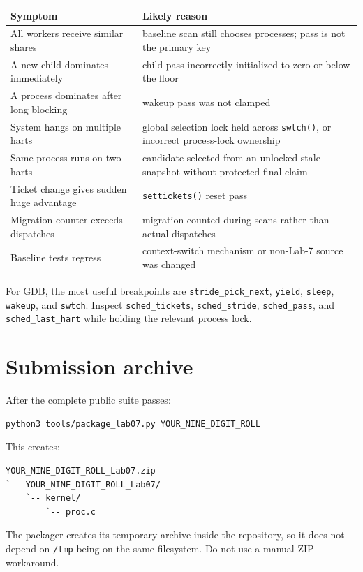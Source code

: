 \documentclass[11pt,a4paper]{article}
\newcommand{\file}[1]{\texttt{#1}}
\begin{document}
\begin{tabularx}{\textwidth}{@{}p{46mm}X@{}}
\toprule
\textbf{Symptom} & \textbf{Likely reason} \\
\midrule
All workers receive similar shares & baseline scan still chooses processes; pass is not the primary key \\
A new child dominates immediately & child pass incorrectly initialized to zero or below the floor \\
A process dominates after long blocking & wakeup pass was not clamped \\
System hangs on multiple harts & global selection lock held across \file{swtch()}, or incorrect process-lock ownership \\
Same process runs on two harts & candidate selected from an unlocked stale snapshot without protected final claim \\
Ticket change gives sudden huge advantage & \file{settickets()} reset pass \\
Migration counter exceeds dispatches & migration counted during scans rather than actual dispatches \\
Baseline tests regress & context-switch mechanism or non-Lab-7 source was changed \\
\bottomrule
\end{tabularx}

For GDB, the most useful breakpoints are \file{stride\_pick\_next}, \file{yield}, \file{sleep}, \file{wakeup}, and \file{swtch}. Inspect \file{sched\_tickets}, \file{sched\_stride}, \file{sched\_pass}, and \file{sched\_last\_hart} while holding the relevant process lock.

\section{Submission archive}

After the complete public suite passes:

\begin{lstlisting}
python3 tools/package_lab07.py YOUR_NINE_DIGIT_ROLL
\end{lstlisting}

This creates:

\begin{lstlisting}
YOUR_NINE_DIGIT_ROLL_Lab07.zip
`-- YOUR_NINE_DIGIT_ROLL_Lab07/
    `-- kernel/
        `-- proc.c
\end{lstlisting}

The packager creates its temporary archive inside the repository, so it does not depend on \file{/tmp} being on the same filesystem. Do not use a manual ZIP workaround.
\end{document}
